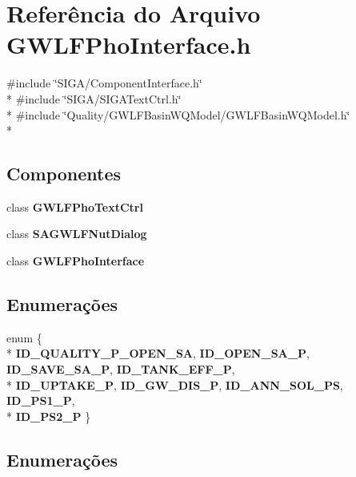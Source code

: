 \section{Referência do Arquivo G\+W\+L\+F\+Pho\+Interface.\+h}
\label{_g_w_l_f_pho_interface_8h}
{\ttfamily \#include \char`\"{}S\+I\+G\+A/\+Component\+Interface.\+h\char`\"{}}\\*
{\ttfamily \#include \char`\"{}S\+I\+G\+A/\+S\+I\+G\+A\+Text\+Ctrl.\+h\char`\"{}}\\*
{\ttfamily \#include \char`\"{}Quality/\+G\+W\+L\+F\+Basin\+W\+Q\+Model/\+G\+W\+L\+F\+Basin\+W\+Q\+Model.\+h\char`\"{}}\\*
\subsection*{Componentes}
\begin{DoxyCompactItemize}
\item 
class {\bf G\+W\+L\+F\+Pho\+Text\+Ctrl}
\item 
class {\bf S\+A\+G\+W\+L\+F\+Nut\+Dialog}
\item 
class {\bf G\+W\+L\+F\+Pho\+Interface}
\end{DoxyCompactItemize}
\subsection*{Enumerações}
\begin{DoxyCompactItemize}
\item 
enum \{ \\*
{\bf I\+D\+\_\+\+Q\+U\+A\+L\+I\+T\+Y\+\_\+\+P\+\_\+\+O\+P\+E\+N\+\_\+\+SA}, 
{\bf I\+D\+\_\+\+O\+P\+E\+N\+\_\+\+S\+A\+\_\+P}, 
{\bf I\+D\+\_\+\+S\+A\+V\+E\+\_\+\+S\+A\+\_\+P}, 
{\bf I\+D\+\_\+\+T\+A\+N\+K\+\_\+\+E\+F\+F\+\_\+P}, 
\\*
{\bf I\+D\+\_\+\+U\+P\+T\+A\+K\+E\+\_\+P}, 
{\bf I\+D\+\_\+\+G\+W\+\_\+\+D\+I\+S\+\_\+P}, 
{\bf I\+D\+\_\+\+A\+N\+N\+\_\+\+S\+O\+L\+\_\+\+PS}, 
{\bf I\+D\+\_\+\+P\+S1\+\_\+P}, 
\\*
{\bf I\+D\+\_\+\+P\+S2\+\_\+P}
 \}
\end{DoxyCompactItemize}


\subsection{Enumerações}
